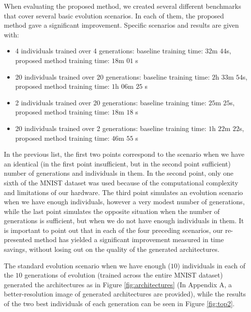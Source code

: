 \documentclass[eng]{simposium}
\begin{document}
When evaluating the proposed method, we created several different benchmarks that cover several basic evolution scenarios.  
In each of them, the proposed method gave a significant improvement.  
Specific scenarios and results are given with: 
\begin{itemize} 
  \item 4 individuals trained over 4 generations: baseline training time: $32$m $44$s, proposed method training time: $18$m $01$ s
  \item 20 individuals trained over 20 generations: baseline training time: $2$h $33$m $54$s, proposed method training time: $1$h $06$m $25$ s 
  \item 2 individuals trained over 20 generations: baseline training time: $25$m $25$s, proposed method training time: $18$m $18$ s 
  \item 20 individuals trained over 2 generations: baseline training time: $1$h $22$m $22$s, proposed method training time: $46$m $55$ s 
\end{itemize} 

In the previous list, the first two points correspond to the scenario when we have an identical  
(in the first point insufficient, but in the second point sufficient) number of generations and individuals in them.  
In the second point, only one sixth of the MNIST dataset was used because of the computational complexity and limitations of our hardware.  
The third point simulates an evolution scenario when we have enough individuals, however a very modest number of generations,  
while the last point simulates the opposite situation when the number of generations is sufficient, but when we do not have  
enough individuals in them.  
It is important to point out that in each of the four preceding scenarios, our re-presented method has yielded a significant  
improvement measured in time savings, without losing out on the quality of the generated architectures.  
  

The standard evolution scenario when we have enough ($10$) individuals in each of the $10$ generations of evolution  
(trained across the entire MNIST dataset) generated the architectures as in Figure \ref{fig:architectures}
(In Appendix A, a better-resolution image of generated architectures are provided), 
while the results of the two best individuals of each generation can be seen in Figure \ref{fig:top2}.  
\end{document}
